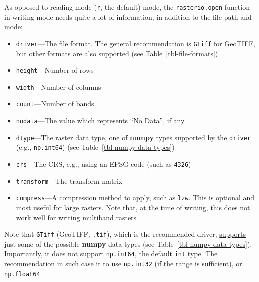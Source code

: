 \documentclass[
  letterpaper,
]{krantz}
\providecommand{\tightlist}{%
  \setlength{\itemsep}{0pt}\setlength{\parskip}{0pt}}\usepackage{longtable,booktabs,array}
\begin{document}
As opposed to reading mode
(\texttt{\textquotesingle{}r\textquotesingle{}}, the default) mode, the
\texttt{rasterio.open} function in writing mode needs quite a lot of
information, in addition to the file path and mode:

\begin{itemize}
\tightlist
\item
  \texttt{driver}---The file format. The general recommendation is
  \texttt{\textquotesingle{}GTiff\textquotesingle{}} for GeoTIFF, but
  other formats are also supported (see Table~\ref{tbl-file-formats})
\item
  \texttt{height}---Number of rows
\item
  \texttt{width}---Number of columns
\item
  \texttt{count}---Number of bands
\item
  \texttt{nodata}---The value which represents ``No Data'', if any
\item
  \texttt{dtype}---The raster data type, one of \textbf{numpy} types
  supported by the \texttt{driver} (e.g., \texttt{np.int64}) (see
  Table~\ref{tbl-numpy-data-types})
\item
  \texttt{crs}---The CRS, e.g., using an EPSG code (such as
  \texttt{4326})
\item
  \texttt{transform}---The transform matrix
\item
  \texttt{compress}---A compression method to apply, such as
  \texttt{\textquotesingle{}lzw\textquotesingle{}}. This is optional and
  most useful for large rasters. Note that, at the time of writing, this
  \href{https://gis.stackexchange.com/questions/404738/why-does-rasterio-compression-reduces-image-size-with-single-band-but-not-with-m}{does
  not work well} for writing multiband rasters
\end{itemize}

\begin{tcolorbox}[enhanced jigsaw, title=\textcolor{quarto-callout-note-color}{\faInfo}\hspace{0.5em}{Note}, coltitle=black, colbacktitle=quarto-callout-note-color!10!white, breakable, titlerule=0mm, colframe=quarto-callout-note-color-frame, opacitybacktitle=0.6, colback=white, bottomrule=.15mm, left=2mm, leftrule=.75mm, toprule=.15mm, toptitle=1mm, bottomtitle=1mm, arc=.35mm, opacityback=0, rightrule=.15mm]

Note that \texttt{\textquotesingle{}GTiff} (GeoTIFF, \texttt{.tif}),
which is the recommended driver,
\href{https://gdal.org/drivers/raster/gtiff.html}{supports} just some of
the possible \textbf{numpy} data types (see
Table~\ref{tbl-numpy-data-types}). Importantly, it does not support
\texttt{np.int64}, the default \texttt{int} type. The recommendation in
such case it to use \texttt{np.int32} (if the range is sufficient), or
\texttt{np.float64}.

\end{tcolorbox}
\end{document}
